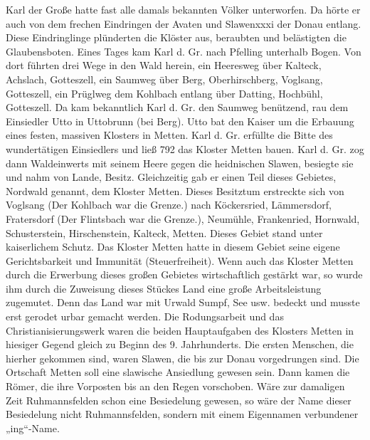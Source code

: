 \documentclass[12pt,a4paper]{book}
\begin{document}
Karl der Große hatte fast alle damals bekannten Völker unterworfen. Da hörte er
auch von dem frechen Eindringen der Avaten und Slawenxxxi der Donau entlang.
Diese Eindringlinge plünderten die Klöster aus, beraubten und belästigten die
Glaubensboten. Eines Tages kam Karl d. Gr. nach Pfelling unterhalb Bogen. Von
dort führten drei Wege in den Wald herein, ein Heeresweg über Kalteck, Achslach,
Gotteszell, ein Saumweg über Berg, Oberhirschberg, Voglsang, Gotteszell, ein
Prüglweg dem Kohlbach entlang über Datting, Hochbühl, Gotteszell. Da kam
bekanntlich Karl d. Gr. den Saumweg benützend, rau dem Einsiedler Utto in
Uttobrunn (bei Berg). Utto bat den Kaiser um die Erbauung eines festen, massiven
Klosters in Metten. Karl d. Gr. erfüllte die Bitte des wundertätigen Einsiedlers
und ließ 792 das Kloster Metten bauen. Karl d. Gr. zog dann Waldeinwerts mit
seinem Heere gegen die heidnischen Slawen, besiegte sie und nahm von Lande,
Besitz. Gleichzeitig gab er einen Teil dieses Gebietes, Nordwald genannt, dem
Kloster Metten. Dieses Besitztum erstreckte sich von Voglsang (Der Kohlbach war
die Grenze.) nach Köckersried, Lämmersdorf, Fratersdorf (Der Flintsbach war die
Grenze.), Neumühle, Frankenried, Hornwald, Schusterstein, Hirschenstein,
Kalteck, Metten. Dieses Gebiet stand unter kaiserlichem Schutz. Das Kloster
Metten hatte in diesem Gebiet seine eigene Gerichtsbarkeit und Immunität
(Steuerfreiheit). Wenn auch das Kloster Metten durch die Erwerbung dieses großen
Gebietes wirtschaftlich gestärkt war, so wurde ihm durch die Zuweisung dieses
Stückes Land eine große Arbeitsleistung zugemutet. Denn das Land war mit Urwald
Sumpf, See usw. bedeckt und musste erst gerodet urbar gemacht werden. Die
Rodungsarbeit und das Christianisierungswerk waren die beiden Hauptaufgaben des
Klosters Metten in hiesiger Gegend gleich zu Beginn des 9. Jahrhunderts. Die
ersten Menschen, die hierher gekommen sind, waren Slawen, die bis zur Donau
vorgedrungen sind. Die Ortschaft Metten soll eine slawische Ansiedlung gewesen
sein. Dann kamen die Römer, die ihre Vorposten bis an den Regen vorschoben. Wäre
zur damaligen Zeit Ruhmannsfelden schon eine Besiedelung gewesen, so wäre der
Name dieser Besiedelung nicht Ruhmannsfelden, sondern mit einem Eigennamen
verbundener „ing“-Name.
\end{document}
